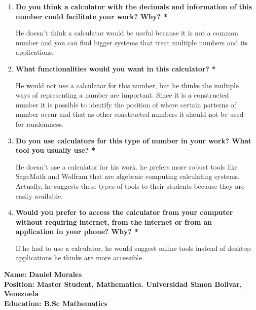 \documentclass{report}
\begin{document}
\begin{enumerate}
\item\textbf{Do you think a calculator with the decimals and information of this number could facilitate your work? Why?\color{red} *}

He doesn’t think a calculator would be useful because it is not a common number and you can find bigger systems that treat multiple numbers and its applications. 

\item\textbf{What functionalities would you want in this calculator?\color{red} *}

He would not use a calculator for this number, but he thinks the multiple ways of representing a number are important. Since it is a constructed number it is possible to identify the position of where certain patterns of number occur and that as other constructed numbers it should not be used for randomness.

\item\textbf{Do you use calculators for this type of number in your work? What tool you usually use?\color{red} *}

He doesn't use a calculator for his work, he prefers more robust tools like SageMath and Wolfram that are algebraic computing calculating systems. Actually, he suggests these types of tools to their students because they are easily available.

\item\textbf{Would you prefer to access the calculator from your computer without requiring internet, from the internet or from an application in your phone? Why?\color{red} *}

If he had to use a calculator, he would suggest online tools instead of desktop applications he thinks are more accessible.\newline

\end{enumerate}

\noindent\textbf{Name: Daniel Morales} \\
\textbf{Position: Master Student, Mathematics. Universidad Simon Bolivar, Venezuela} \\
\textbf{Education: B.Sc Mathematics} 
\newline
\end{document}
